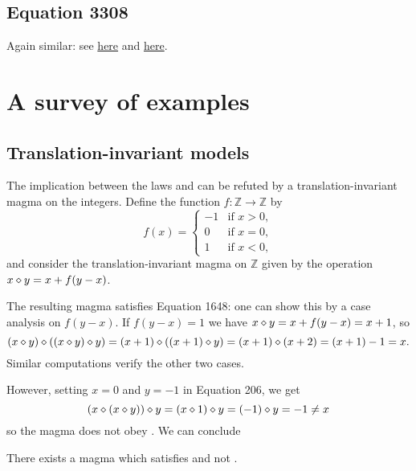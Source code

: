 \subsection{Equation 3308}

Again similar: see \href{https://leanprover.zulipchat.com/#narrow/channel/458659-Equational/topic/713.2C.201289.2C.201447/near/482066500}{here} and \href{https://leanprover.zulipchat.com/#narrow/channel/458659-Equational/topic/713.2C.201289.2C.201447/near/483735768}{here}.


\section{A survey of examples}\label{infinite-examples-section}

\subsection{Translation-invariant models}

The implication between the laws  and  can be refuted by a translation-invariant
magma on the integers. Define the function $f: \mathbb{Z} \to \mathbb{Z}$ by
$$f(x) =
\begin{cases}
  -1  & \text{if } x > 0, \\
   0  & \text{if } x = 0, \\
   1  & \text{if } x < 0,
\end{cases}$$
and consider the translation-invariant magma on $\mathbb{Z}$ given by the operation $x \diamond y = x + f(y-x)$.

The resulting magma satisfies Equation 1648: one can show this by a case analysis on $f(y-x)$. If $f(y-x)=1$ we have $x \diamond y = x + f(y-x) = x + 1$, so
$$(x \diamond y) \diamond ((x \diamond y) \diamond y) = (x + 1) \diamond ((x + 1) \diamond y) = (x + 1) \diamond (x + 2) = (x + 1) - 1 = x.$$
Similar computations verify the other two cases.

However, setting $x=0$ and $y=-1$ in Equation 206, we get
$$(x \diamond (x \diamond y)) \diamond y = (x \diamond 1) \diamond y = (-1) \diamond y = -1 \neq x$$
so the magma does not obey . We can conclude

\begin{theorem}\label{non_imp_1648_206_thm}
  \leanok
  There exists a magma which satisfies  and not .
\end{theorem}

